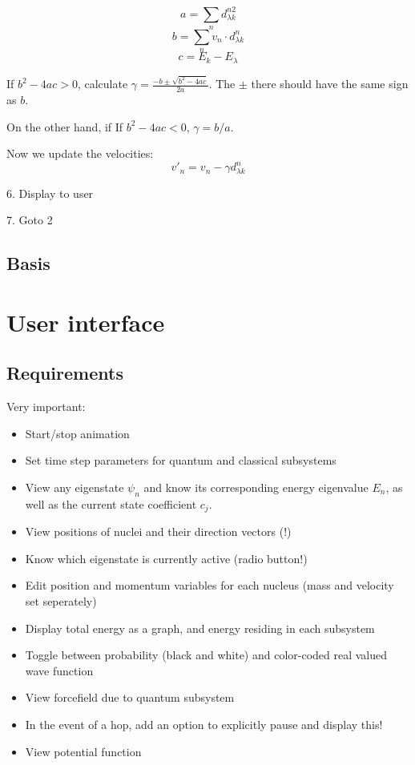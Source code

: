 \documentclass[12pt]{article}
\begin{document}
\[ a = \sum_n d_{\lambda k}^{n2} \]
\[ b = \sum_n v_n \cdot d_{\lambda k}^{n} \]
\[ c = E_k - E_\lambda \]

If $b^2 - 4ac > 0$, calculate $\gamma = \frac{-b \pm \sqrt{b^2 - 4ac}}{2a}$. The $\pm$ there should have the same sign as $b$.

On the other hand, if If $b^2 - 4ac < 0$, $\gamma = b / a$.

Now we update the velocities:
\[ v'_n = v_n - \gamma d^n_{\lambda k} \]

6. Display to user

7. Goto 2

\subsection{Basis}

\section{User interface}
\subsection{Requirements}
Very important:
\begin{itemize}
    \item Start/stop animation
    \item Set time step parameters for quantum and classical subsystems
    \item View any eigenstate $\psi_n$ and know its corresponding energy eigenvalue $E_n$, as well as the current state coefficient $c_j$.
    \item View positions of nuclei and their direction vectors (!)
    \item Know which eigenstate is currently active (radio button!)
    \item Edit position and momentum variables for each nucleus (mass and velocity set seperately)
    \item Display total energy as a graph, and energy residing in each subsystem
    \item Toggle between probability (black and white) and color-coded real valued wave function
    \item View forcefield due to quantum subsystem
    \item In the event of a hop, add an option to explicitly pause and display this! 
    \item View potential function
\end{itemize}
\end{document}
